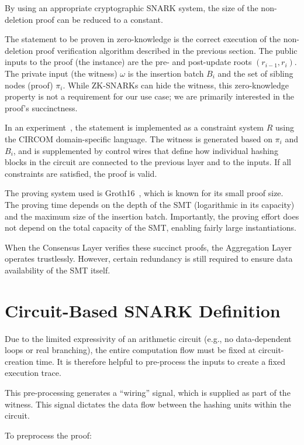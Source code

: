 \documentclass[twocolumn]{article}
\begin{document}
By using an appropriate cryptographic SNARK system, the size of the non-deletion proof can be reduced to a constant.

The statement to be proven in zero-knowledge is the correct execution of the non-deletion proof verification algorithm described in the previous section. The public inputs to the proof (the instance) are the pre- and post-update roots $(r_{i-1}, r_i)$. The private input (the witness) $\omega$ is the insertion batch $B_i$ and the set of sibling nodes (proof) $\pi_i$. While ZK-SNARKs can hide the witness, this zero-knowledge property is not a requirement for our use case; we are primarily interested in the proof's succinctness.

In an experiment~\cite{snark}, the statement is implemented as a constraint system $R$ using the CIRCOM domain-specific language. The witness is generated based on $\pi_i$ and $B_i$, and is supplemented by control wires that define how individual hashing blocks in the circuit are connected to the previous layer and to the inputs. If all constraints are satisfied, the proof is valid.

The proving system used is Groth16~\cite{cryptoeprint:2016/260}, which is known for its small proof size. The proving time depends on the depth of the SMT (logarithmic in its capacity) and the maximum size of the insertion batch. Importantly, the proving effort does not depend on the total capacity of the SMT, enabling fairly large instantiations.

When the Consensus Layer verifies these succinct proofs, the Aggregation Layer operates trustlessly. However, certain redundancy is still required to ensure data availability of the SMT itself.


\section{Circuit-Based SNARK Definition}

Due to the limited expressivity of an arithmetic circuit (e.g., no data-dependent loops or real branching), the entire computation flow must be fixed at circuit-creation time. It is therefore helpful to pre-process the inputs to create a fixed execution trace.

This pre-processing generates a ``wiring'' signal, which is supplied as part of the witness. This signal dictates the data flow between the hashing units within the circuit.

To preprocess the proof:
\end{document}

